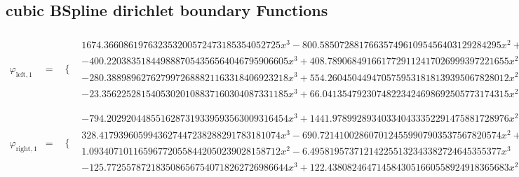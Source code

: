 \documentclass{article}
\begin{document}
 \begin{landscape}
 \subsection{cubic BSpline dirichlet boundary Functions}
 \begin{eqnarray*}
 \varphi_{\text{left},1} & = & \begin{array}{cc}
 \{ & 
\begin{array}{cc}
 1674.366086197632353200572473185354052725 x^3-800.5850728817663574961095456403129284295 x^2+90.44714759915845269892521083337452599385 x & x\geq 0\land x<\frac{1}{4} \\
 -400.2203835184498887054356564046795906605 x^3+408.7890684916617729112417026999397221655 x^2-125.2549600157901921473738890386204911689 x+10.75505665721168809089669897157723930639 & x\geq \frac{1}{4}\land x<\frac{1}{2} \\
 -280.3889896276279972688821163318406923218 x^3+554.2604504494705759531818139395067828012 x^2-360.5998873917154137667291553328167255586 x+77.08075061936936171052011179967872905001 & x\geq \frac{1}{2}\land x<\frac{3}{4} \\
 -23.35622528154053020108837160304087331185 x^3+66.04135479230748223424698692505773174315 x^2-62.01403373999337386522885904099284355075 x+19.32890422922642183207024371897598511945 & x\geq \frac{3}{4}\land x<1
\end{array}

\end{array}\\ 
\varphi_{\text{right},1} & = & \begin{array}{cc}
 \{ & 
\begin{array}{cc}
 -794.2029204485516287319339593563009316454 x^3+1441.978992893403340433352291475881728976 x^2-856.5260877472235931638010527738298618815 x+166.6342811014747173497388838646203387164 & x\geq \frac{1}{2}\land x<\frac{3}{4} \\
 328.4179396059943627447238288291783181074 x^3-690.7214100286070124559907903537567820574 x^2+448.1018152937455755533535524076316707112 x-85.79834487113292584208659088305320676111 & x\geq \frac{3}{4}\land x<1 \\
 1.093407101165967720558442050239028158712 x^2-6.495819573712142255132343382724645355377 x^3 & x\geq 0\land x<\frac{1}{4} \\
 -125.7725578721835086567540718262726986644 x^3+122.4380824647145843051660558924918365683 x^2-38.30794925081092709199973283796114420936 x+3.856644138394558336487296851279923859694 & x\geq \frac{1}{4}\land x<\frac{1}{2}
\end{array}

\end{array}\end{eqnarray*}
\end{landscape}
\end{document}
